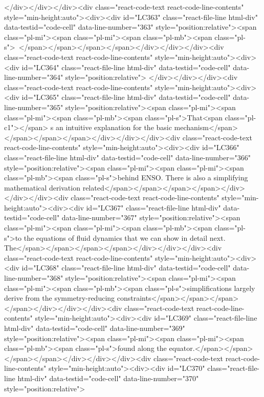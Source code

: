 {{{{</div></div></div><div class="react-code-text react-code-line-contents" style="min-height:auto"><div><div id="LC363" class="react-file-line html-div" data-testid="code-cell" data-line-number="363" style="position:relative"><span class="pl-mi"><span class="pl-mi"><span class="pl-mb"><span class="pl-s">~</span></span></span></span></div></div></div><div class="react-code-text react-code-line-contents" style="min-height:auto"><div><div id="LC364" class="react-file-line html-div" data-testid="code-cell" data-line-number="364" style="position:relative">
</div></div></div><div class="react-code-text react-code-line-contents" style="min-height:auto"><div><div id="LC365" class="react-file-line html-div" data-testid="code-cell" data-line-number="365" style="position:relative"><span class="pl-mi"><span class="pl-mi"><span class="pl-mb"><span class="pl-s">That<span class="pl-c1">\textquotesingle</span> s an intuitive explanation for the basic mechanism</span></span></span></span></div></div></div><div class="react-code-text react-code-line-contents" style="min-height:auto"><div><div id="LC366" class="react-file-line html-div" data-testid="code-cell" data-line-number="366" style="position:relative"><span class="pl-mi"><span class="pl-mi"><span class="pl-mb"><span class="pl-s">behind ENSO. There is also a simplifying mathematical derivation related</span></span></span></span></div></div></div><div class="react-code-text react-code-line-contents" style="min-height:auto"><div><div id="LC367" class="react-file-line html-div" data-testid="code-cell" data-line-number="367" style="position:relative"><span class="pl-mi"><span class="pl-mi"><span class="pl-mb"><span class="pl-s">to the equations of fluid dynamics that we can show in detail next. The</span></span></span></span></div></div></div><div class="react-code-text react-code-line-contents" style="min-height:auto"><div><div id="LC368" class="react-file-line html-div" data-testid="code-cell" data-line-number="368" style="position:relative"><span class="pl-mi"><span class="pl-mi"><span class="pl-mb"><span class="pl-s">simplifications largely derive from the symmetry-reducing constraints</span></span></span></span></div></div></div><div class="react-code-text react-code-line-contents" style="min-height:auto"><div><div id="LC369" class="react-file-line html-div" data-testid="code-cell" data-line-number="369" style="position:relative"><span class="pl-mi"><span class="pl-mi"><span class="pl-mb"><span class="pl-s">found along the equator.</span></span></span></span></div></div></div><div class="react-code-text react-code-line-contents" style="min-height:auto"><div><div id="LC370" class="react-file-line html-div" data-testid="code-cell" data-line-number="370" style="position:relative">
}}}}
